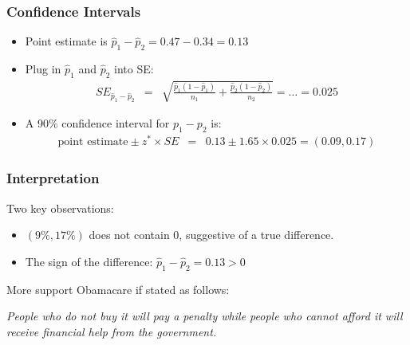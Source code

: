 \documentclass[handout]{beamer}
\newcommand{\blue}[1]{\textcolor{blue2}{#1}}
\newcommand{\phat}{\widehat{p}}
\begin{document}
\begin{frame}[fragile]
\frametitle{Confidence Intervals}
%
%
\begin{itemize}
\item Point estimate is $\phat_1 - \phat_2 = 0.47 - 0.34 = 0.13$
\pause\item Plug in $\phat_1$ and $\phat_2$ into SE:
\begin{eqnarray*}
SE_{\phat_1 - \phat_2} &=& 
\sqrt{\frac{\phat_1(1-\phat_1)}{n_1} + \frac{\phat_2(1-\phat_2)}{n_2}}= \ldots = 0.025
\end{eqnarray*}
\pause\item A 90\% confidence interval for $p_1-p_2$ is:
\pause\begin{eqnarray*}
\mbox{point estimate} \pm z^* \times SE &=& 0.13 \pm 1.65 \times 0.025 = (0.09, 0.17)
\end{eqnarray*}
\end{itemize}

\end{frame}


\begin{frame}[fragile]
\frametitle{Interpretation}

Two key observations:
\begin{itemize}
\item $(9\%, 17\%)$ does not contain 0, suggestive of a true difference.
\item The sign of the difference: $\phat_1 - \phat_2 = 0.13 > 0$
\end{itemize}

\vspace{0.25cm}

\pause More support Obamacare if stated as follows:

\vspace{0.25cm}

\textit{People who do not buy it will pay a penalty \blue{while} people who cannot afford it will receive financial help from the government.}

\end{frame}
\end{document}

